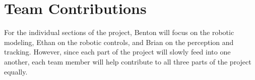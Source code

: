 \documentclass{article}
\begin{document}




\section{Team Contributions}
For the individual sections of the project, Benton will focus on the robotic
modeling, Ethan on the robotic controls, and Brian on the perception and
tracking.
However, since each part of the project will slowly feed into one another, each
team member will help contribute to all three parts of the project equally.
\end{document}
